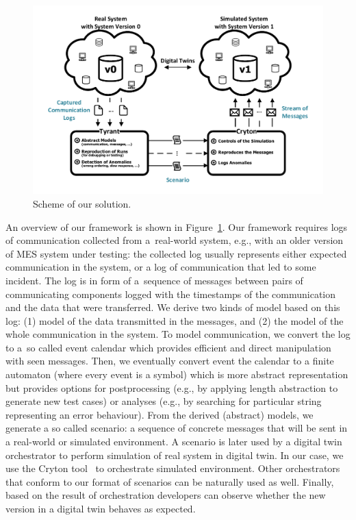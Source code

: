 {%
\begin{figure}[bt]
  \centering
  \includegraphics[scale=0.8]{figs/eurocast-diagram.pdf}
  \caption{Scheme of our solution.}
  \label{fig:tunis-diagram}
\end{figure}

An overview of our framework is shown in Figure~\ref{fig:tunis-diagram}.  
%
Our framework requires logs of communication collected from a~real-world
system, e.g., with an older version of MES system under testing: the collected log
usually represents either expected communication in the system, or a log of
communication that led to some incident.  
%
The log is in form of a~sequence of messages between pairs of communicating
components logged with the timestamps of the communication and the data that
were transferred.
%
We derive two kinds of model based on this log: (1) model of the data
transmitted in the messages, and (2) the model of the whole communication in
the system.
%
To model communication, we convert the log to a~so called event calendar
which provides efficient and direct manipulation with seen messages.
Then, we eventually convert event the calendar to a finite automaton (where
every event is a symbol) which is more abstract representation but provides
options for postprocessing (e.g., by applying length abstraction to generate
new test cases) or analyses (e.g., by searching for particular string
representing an error behaviour).
%
From the derived (abstract) models, we generate a so called scenario: a
sequence of concrete messages that will be sent in a real-world or simulated
environment. 
%
A scenario is later used by a digital twin orchestrator to perform simulation
of real system in digital twin.
%
In our case, we use the Cryton tool~\cite{ref_cryton} to orchestrate simulated
environment. Other orchestrators that conform to our format of scenarios can be
naturally used as well. 
%
%
Finally, based on the result of orchestration developers can observe whether
the new version in a digital twin behaves as expected.

}
